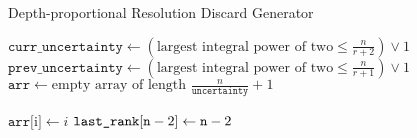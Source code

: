 \begin{algorithm}
\caption{Depth-proportional Resolution Discard Generator}
\label{alg:depth-proportional-resolution-algo-gen-drop-ranks}
\begin{algorithmic}[1]

    \State $\texttt{curr\_uncertainty} \gets (\text{largest integral power of two} \le \frac{n}{r + 2}) \lor 1$
    \State $\texttt{prev\_uncertainty} \gets (\text{largest integral power of two} \le \frac{n}{r + 1}) \lor 1$
    \State $\texttt{arr} \gets \text{empty array of length } \frac{n}{\texttt{uncertainty}} + 1$

            \State $\texttt{arr} [$i$] \gets i$
        \EndFor
    \EndIf
        \State $\texttt{\texttt{last\_rank}} [\texttt{n} - 2] \gets \texttt{n} - 2$
    \EndIf
\end{algorithmic}
\end{algorithm}
